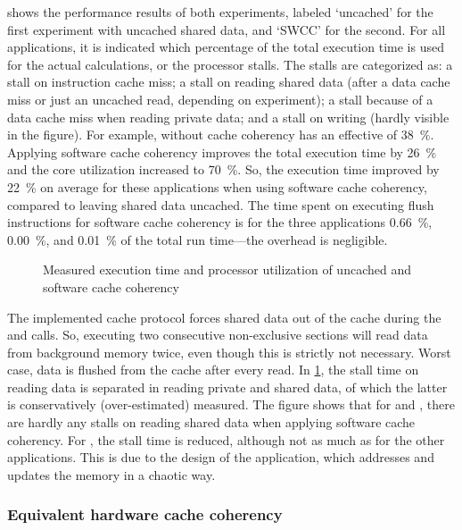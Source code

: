  shows the performance results of both experiments, labeled `uncached' for the first experiment with uncached shared data, and `\acs{SWCC}' for the second.
For all applications, it is indicated which percentage of the total execution time is used for the actual calculations, or the processor stalls.
The stalls are categorized as:
a stall on instruction cache miss;
a stall on reading shared data (after a data cache miss or just an uncached read, depending on experiment);
a stall because of a data cache miss when reading private data; and
a stall on writing (hardly visible in the figure).
For example,  without cache coherency has an effective  of \SI{38}{\percent}.
Applying software cache coherency improves the total execution time by \SI{26}{\percent} and the core utilization increased to \SI{70}{\percent}.
So, the execution time improved by \SI{22}{\percent} on average for these applications when using software cache coherency, compared to leaving shared data uncached.
The time spent on executing flush instructions for software cache coherency is for the three applications \SI{0.66}{\percent}, \SI{0.00}{\percent}, and \SI{0.01}{\percent} of the total run time---the overhead is negligible.

\begin{figure}%
%
\caption{Measured execution time and processor utilization of uncached and software cache coherency}%
\label{fig:memory:util_swcc}%
\end{figure}

The implemented cache protocol forces shared data out of the cache during the  and  calls.
So, executing two consecutive non-exclusive sections will read data from background memory twice, even though this is strictly not necessary.
Worst case, data is flushed from the cache after every read.
In \cref{fig:memory:util_swcc}, the stall time on reading data is separated in reading private and shared data, of which the latter is conservatively (\ie over-estimated) measured.
The figure shows that for  and , there are hardly any stalls on reading shared data when applying software cache coherency.
For , the stall time is reduced, although not as much as for the other applications.
This is due to the design of the application, which addresses and updates the memory in a chaotic way.

\subsubsection{Equivalent hardware cache coherency}

